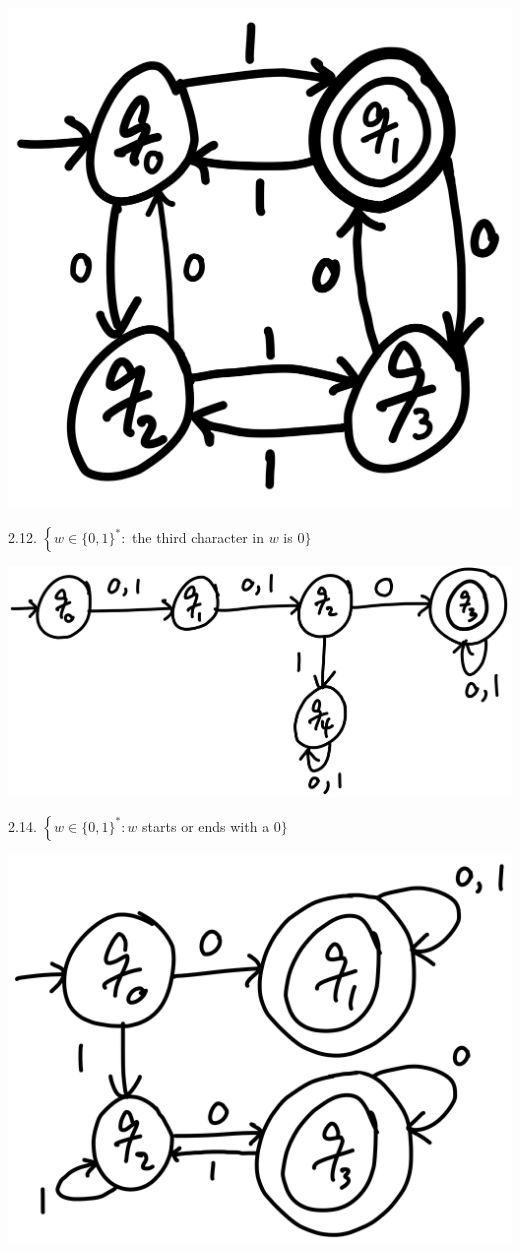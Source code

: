 \documentclass[10pt]{article}
\begin{document}
\begin{enumerate}[label={}]
            \includegraphics[scale=0.2]{2.8}


            2.12. $\left\{w \in\{0,1\}^*:\right.$ the third character in $w$ is 0$\}$


            \includegraphics[scale=0.2]{2.12}


            2.14. $\left\{w \in\{0,1\}^*: w\right.$ starts or ends with a 0$\}$


            \includegraphics[scale=0.2]{2.14}



\end{enumerate}
\end{document}
